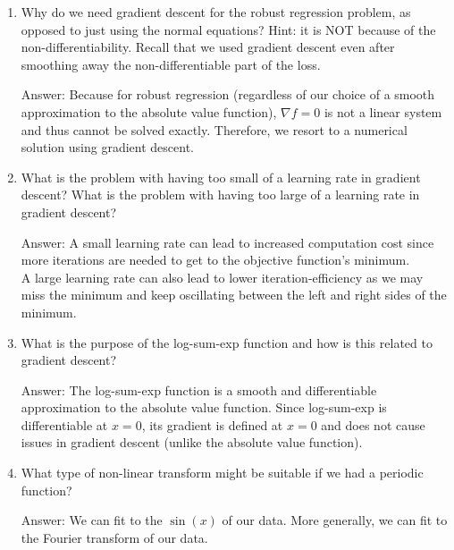 \documentclass{article}
\newenvironment{answer}{\par\begingroup\color{gre}Answer: }{\endgroup}
\begin{document}
\begin{enumerate}
\item Why do we need gradient descent for the robust regression problem, as opposed to just using the normal equations? Hint: it is NOT because of the non-differentiability. Recall that we used gradient descent even after smoothing away the non-differentiable part of the loss.
\begin{answer}
    Because for robust regression (regardless of our choice of a smooth approximation to the absolute value function), $\nabla f = 0$ is not a linear system and thus cannot be solved exactly. Therefore, we resort to a numerical solution using gradient descent.
\end{answer}

\item What is the problem with having too small of a learning rate in gradient descent? What is the problem with having too large of a learning rate in gradient descent?
\begin{answer}
    A small learning rate can lead to increased computation cost since more iterations are needed to get to the objective function's minimum.\\
    A large learning rate can also lead to lower iteration-efficiency as we may miss the minimum and keep oscillating between the left and right sides of the minimum.
\end{answer}

\item What is the purpose of the log-sum-exp function and how is this related to gradient descent?
\begin{answer}
    The log-sum-exp function is a smooth and differentiable approximation to the absolute value function. Since log-sum-exp is differentiable at $x=0$, its gradient is defined at $x=0$ and does not cause issues in gradient descent (unlike the absolute value function).
\end{answer}

\item What type of non-linear transform might be suitable if we had a periodic function?
\begin{answer}
    We can fit to the $\sin(x)$ of our data. More generally, we can fit to the Fourier transform of our data.
\end{answer}
\end{enumerate}
\end{document}
